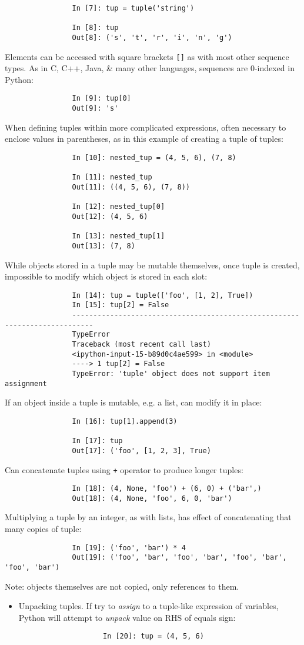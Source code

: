 \documentclass{article}
\begin{document}
\begin{itemize}
\begin{itemize}
\begin{itemize}
\begin{verbatim}
				In [7]: tup = tuple('string')
				
				In [8]: tup
				Out[8]: ('s', 't', 'r', 'i', 'n', 'g')
			\end{verbatim}
			Elements can be accessed with square brackets {\tt[]} as with most other sequence types. As in C, C++, Java, \& many other languages, sequences are 0-indexed in Python:
			\begin{verbatim}
				In [9]: tup[0]
				Out[9]: 's'
			\end{verbatim}
			When defining tuples within more complicated expressions, often necessary to enclose values in parentheses, as in this example of creating a tuple of tuples:
			\begin{verbatim}
				In [10]: nested_tup = (4, 5, 6), (7, 8)
				
				In [11]: nested_tup
				Out[11]: ((4, 5, 6), (7, 8))
				
				In [12]: nested_tup[0]
				Out[12]: (4, 5, 6)
				
				In [13]: nested_tup[1]
				Out[13]: (7, 8)
			\end{verbatim}
			While objects stored in a tuple may be mutable themselves, once tuple is created, impossible to modify which object is stored in each slot:
			\begin{verbatim}
				In [14]: tup = tuple(['foo', [1, 2], True])
				In [15]: tup[2] = False
				---------------------------------------------------------------------------
				TypeError
				Traceback (most recent call last)
				<ipython-input-15-b89d0c4ae599> in <module>
				----> 1 tup[2] = False
				TypeError: 'tuple' object does not support item assignment
			\end{verbatim}
			If an object inside a tuple is mutable, e.g. a list, can modify it in place:
			\begin{verbatim}
				In [16]: tup[1].append(3)
				
				In [17]: tup
				Out[17]: ('foo', [1, 2, 3], True)
			\end{verbatim}
			Can concatenate tuples using {\tt+} operator to produce longer tuples:
			\begin{verbatim}
				In [18]: (4, None, 'foo') + (6, 0) + ('bar',)
				Out[18]: (4, None, 'foo', 6, 0, 'bar')
			\end{verbatim}
			Multiplying a tuple by an integer, as with lists, has effect of concatenating that many copies of tuple:
			\begin{verbatim}
				In [19]: ('foo', 'bar') * 4
				Out[19]: ('foo', 'bar', 'foo', 'bar', 'foo', 'bar', 'foo', 'bar')
			\end{verbatim}
			Note: objects themselves are not copied, only references to them.
			\begin{itemize}
				\item {\sf Unpacking tuples.} If try to {\it assign} to a tuple-like expression of variables, Python will attempt to {\it unpack} value on RHS of equals sign:
				\begin{verbatim}
					In [20]: tup = (4, 5, 6)
					

\end{verbatim}
\end{itemize}
\end{itemize}
\end{itemize}
\end{itemize}
\end{document}
